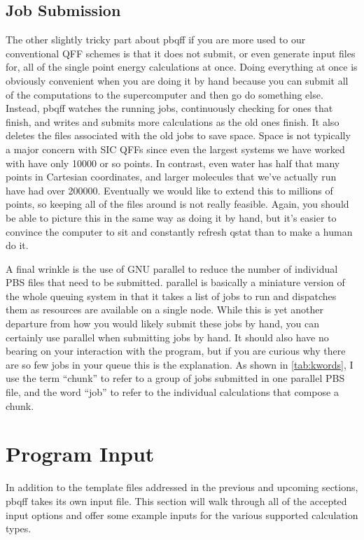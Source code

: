 \documentclass{article}
\begin{document}
\subsection{Job Submission}

The other slightly tricky part about pbqff if you are more used to our
conventional QFF schemes is that it does not submit, or even generate
input files for, all of the single point energy calculations at
once. Doing everything at once is obviously convenient when you are
doing it by hand because you can submit all of the computations to the
supercomputer and then go do something else. Instead, pbqff watches
the running jobs, continuously checking for ones that finish, and
writes and submits more calculations as the old ones finish. It also
deletes the files associated with the old jobs to save space. Space is
not typically a major concern with SIC QFFs since even the largest
systems we have worked with have only 10000 or so points. In contrast,
even water has half that many points in Cartesian coordinates, and
larger molecules that we've actually run have had over
200000. Eventually we would like to extend this to millions of points,
so keeping all of the files around is not really feasible. Again, you
should be able to picture this in the same way as doing it by hand,
but it's easier to convince the computer to sit and constantly refresh
qstat than to make a human do it.

A final wrinkle is the use of GNU parallel to reduce the number of
individual PBS files that need to be submitted. parallel is basically
a miniature version of the whole queuing system in that it takes a
list of jobs to run and dispatches them as resources are available on
a single node. While this is yet another departure from how you would
likely submit these jobs by hand, you can certainly use parallel when
submitting jobs by hand. It should also have no bearing on your
interaction with the program, but if you are curious why there are so
few jobs in your queue this is the explanation. As shown in
\autoref{tab:kwords}, I use the term ``chunk'' to refer to a group of
jobs submitted in one parallel PBS file, and the word ``job'' to refer
to the individual calculations that compose a chunk.

\section{Program Input}

In addition to the template files addressed in the previous and
upcoming sections, pbqff takes its own input file. This section will
walk through all of the accepted input options and offer some example
inputs for the various supported calculation types.
\end{document}
